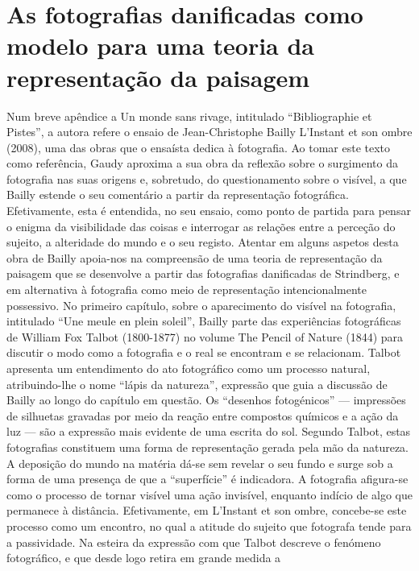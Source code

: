 \documentclass{article}
\begin{document}
\section{As fotografias danificadas como modelo para uma teoria da representação da paisagem}
Num breve apêndice a Un monde sans rivage, intitulado “Bibliographie et Pistes”, a
autora refere o ensaio de Jean-Christophe Bailly L’Instant et son ombre (2008), uma
das obras que o ensaísta dedica à fotografia. Ao tomar este texto como referência,
Gaudy aproxima a sua obra da reflexão sobre o surgimento da fotografia nas suas
origens e, sobretudo, do questionamento sobre o visível, a que Bailly estende o seu
comentário a partir da representação fotográfica. Efetivamente, esta é entendida, no
seu ensaio, como ponto de partida para pensar o enigma da visibilidade das coisas e
interrogar as relações entre a perceção do sujeito, a alteridade do mundo e o seu
registo. Atentar em alguns aspetos desta obra de Bailly apoia-nos na compreensão
de uma teoria de representação da paisagem que se desenvolve a partir das fotografias danificadas de Strindberg, e em alternativa à fotografia como meio de representação intencionalmente possessivo.
No primeiro capítulo, sobre o aparecimento do visível na fotografia, intitulado
“Une meule en plein soleil”, Bailly parte das experiências fotográficas de William
Fox Talbot (1800-1877) no volume The Pencil of Nature (1844) para discutir o modo
como a fotografia e o real se encontram e se relacionam. Talbot apresenta um entendimento do ato fotográfico como um processo natural, atribuindo-lhe o nome “lápis
da natureza”, expressão que guia a discussão de Bailly ao longo do capítulo em questão. Os “desenhos fotogénicos” — impressões de silhuetas gravadas por meio da reação entre compostos químicos e a ação da luz — são a expressão mais evidente de
uma escrita do sol. Segundo Talbot, estas fotografias constituem uma forma de representação gerada pela mão da natureza. A deposição do mundo na matéria dá-se
sem revelar o seu fundo e surge sob a forma de uma presença de que a “superfície” é
indicadora. A fotografia afigura-se como o processo de tornar visível uma ação invisível, enquanto indício de algo que permanece à distância. Efetivamente, em L’Instant et son ombre, concebe-se este processo como um encontro, no qual a atitude do
sujeito que fotografa tende para a passividade. Na esteira da expressão com que Talbot descreve o fenómeno fotográfico, e que desde logo retira em grande medida a
\end{document}
